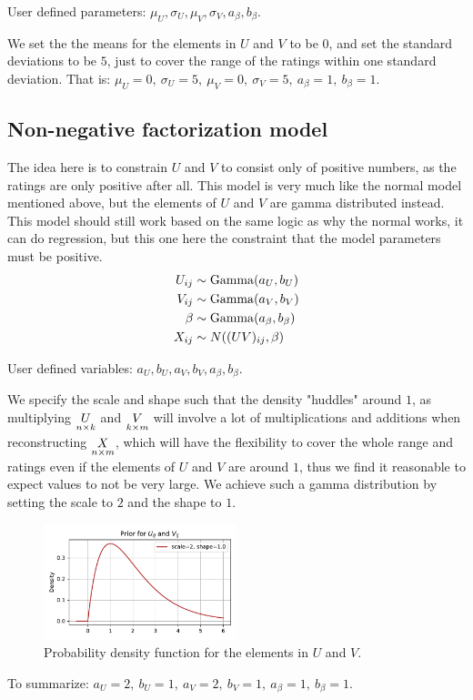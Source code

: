 \documentclass[12pt]{article}
\begin{document}
    User defined parameters: $\mu_U, \sigma_U, \mu_V, \sigma_V, a_\beta, b_\beta$.
    
    \vspace{3mm}
    We set the the means for the elements in $U$ and $V$ to be $0$, and set the standard deviations to be $5$, just to cover the range of the ratings within one standard deviation. That is: $\mu_U=0,\ \sigma_U=5,\ \mu_V=0,\ \sigma_V=5,\ a_\beta=1,\ b_\beta=1$.

    \subsection{Non-negative factorization model}
    The idea here is to constrain $U$ and $V$ to consist only of positive numbers, as the ratings are only positive after all. This model is very much like the normal model mentioned above, but the elements of $U$ and $V$ are gamma distributed instead. This model should still work based on the same logic as why the normal works, it can do regression, but this one here the constraint that the model parameters must be positive. 
    \begin{align*}
        U_{ij} &\sim \operatorname{Gamma}(a_U, b_U) \\
        V_{ij} &\sim \operatorname{Gamma}(a_V, b_V) \\
        \beta  &\sim \operatorname{Gamma}(a_\beta, b_\beta) \\
        X_{ij} &\sim N((UV)_{ij}, \beta) 
    \end{align*}

    User defined variables: $a_U, b_U, a_V, b_V, a_\beta, b_\beta$.
    
    \vspace{3mm}
    We specify the scale and shape such that the density "huddles" around $1$, as multiplying $\underset{n \times k}{U}$ and $\underset{k \times m}{V}$ will involve a lot of multiplications and additions when reconstructing $\underset{n \times m}{X}$, which will have the flexibility to cover the whole range and ratings even if the elements of $U$ and $V$ are around $1$, thus we find it reasonable to expect values to not be very large. We achieve such a gamma distribution by setting the scale to $2$ and the shape to $1$.
    \begin{figure}[H]
        \centering
        \includegraphics[width=0.5\textwidth]{nmfprior.pdf}
        \caption{Probability density function for the elements in $U$ and $V$.}
    \end{figure}
    To summarize: $a_U=2,\ b_U=1,\ a_V=2,\ b_V=1,\ a_\beta=1,\ b_\beta=1$.
\end{document}
